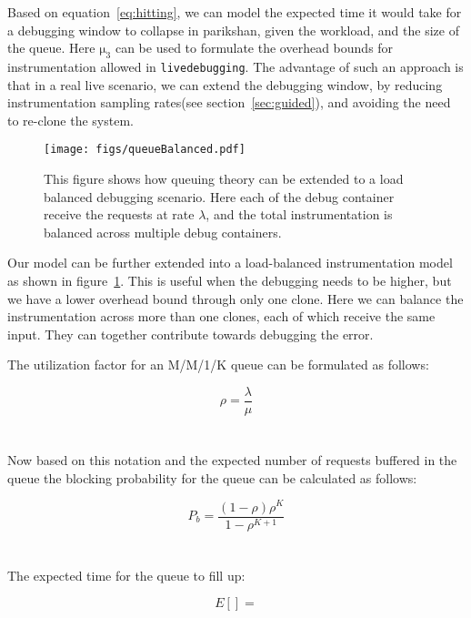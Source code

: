 Based on equation~\ref{eq:hitting}, we can model the expected time it would take for a debugging window to collapse in parikshan, given the workload, and the size of the queue. 
Here $\mathrm{\mu_{3}}$ can be used to formulate the overhead bounds for instrumentation allowed in \texttt{livedebugging}.
The advantage of such an approach is that in a real live scenario, we can extend the debugging window, by reducing instrumentation sampling rates(see section~\ref{sec:guided}), and avoiding the need to re-clone the system.

\begin{figure}[h]
	\begin{center}
		\texttt{[image: figs/queueBalanced.pdf]}
		\caption{This figure shows how queuing theory can be extended to a load balanced debugging scenario. Here each of the debug container receive the requests at rate $\lambda$, and the total instrumentation is balanced across multiple debug containers.}
		\label{fig:queueBalanced}
	\end{center}
\end{figure}

Our model can be further extended into a load-balanced instrumentation model as shown in figure~\ref{fig:queueBalanced}. 
This is useful when the debugging needs to be higher, but we have a lower overhead bound through only one clone.
Here we can balance the instrumentation across more than one clones, each of which receive the same input.
They can together contribute towards debugging the error.

\iffalse
The utilization factor for an M/M/1/K queue can be formulated as follows:

\begin{equation}
\rho = \frac{\lambda}{\mu}
\end{equation}
\\ \\

Now based on this notation and the expected number of requests buffered in the queue the blocking probability for the queue can be calculated as follows:

\begin{equation}
P_{b} = \frac{(1-\rho)\rho^{K}}{1-\rho^{K+1}}
\end{equation}
\\ \\

The expected time for the queue to fill up:

\begin{equation}
E[] =
\end{equation}

